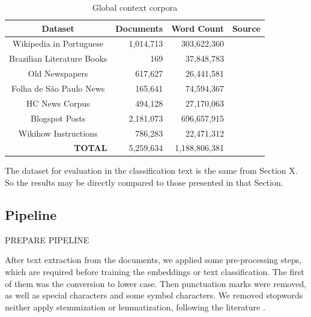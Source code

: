 \begin{table}[htb]
\caption{Global context corpora}
\label{tab:global_corpora}
\centering
\begin{tabular}{@{}crrc@{}}
\toprule
\textbf{Dataset}                   & \textbf{Documents} & \textbf{Word Count} & \textbf{Source} \\ \midrule
Wikipedia in Portuguese            & 1,014,713          & 303,622,360         & \textcite{Wikipedia2019}                \\\hdashline
Brazilian Literature Books         & 169                & 37,848,783          & \textcite{Tatman2017}                 \\\hdashline
Old Newspapers                     & 617,627            & 26,441,581          &         \textcite{Tan2020}     \\\hdashline
Folha de São Paulo News            & 165,641            & 74,594,367          &                     \textcite{Marlessonn2019}             \\\hdashline
HC News Corpus                     & 494,128            & 27,170,063          &        \textcite{Christensen2016}         \\\hdashline
Blogspot Posts                     & 2,181,073          & 696,657,915         &          \textcite{Santos2018}       \\\hdashline
Wikihow Instructions               & 786,283            & 22,471,312          &        \textcite{Chocron2018}         \\ \midrule
\multicolumn{1}{r}{\textbf{TOTAL}} & 5,259,634          & 1,188,806,381       & \textbf{}       \\ \bottomrule
\end{tabular}

\end{table}

The dataset for evaluation in the classification text is the same from Section X. So the results may be directly  compared to those presented in that Section.

\subsection{Pipeline}

PREPARE PIPELINE

After text extraction from the documents, we applied some pre-processing steps, which are required before training the embeddings or text classification. The first of them was the conversion to lower case. Then punctuation marks were removed, as well as special characters and some symbol characters. We removed stopwords neither apply stemmization or lemmatization, following the literature  \cite{Mikolov2013, Pennington2014}.

